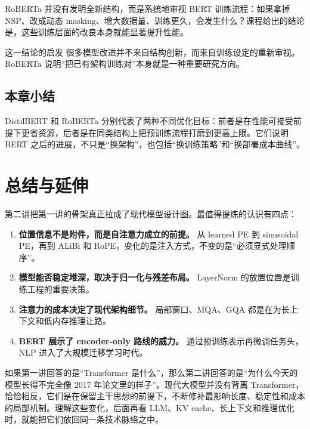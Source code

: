 \documentclass[a4paper]{article}
\begin{document}
RoBERTa 并没有发明全新结构，而是系统地审视 BERT 训练流程：如果拿掉 NSP、改成动态 masking、增大数据量、训练更久，会发生什么？课程给出的结论是，这些训练层面的改良本身就能显著提升性能。

\begin{warningbox}{这一结论的启发}
很多模型改进并不来自结构创新，而来自训练设定的重新审视。RoBERTa 说明“把已有架构训练对”本身就是一种重要研究方向。
\end{warningbox}

\subsection{本章小结}

DistilBERT 和 RoBERTa 分别代表了两种不同优化目标：前者是在性能可接受前提下更省资源，后者是在同类结构上把预训练流程打磨到更高上限。它们说明 BERT 之后的进展，不只是“换架构”，也包括“换训练策略”和“换部署成本曲线”。

\section{总结与延伸}

第二讲把第一讲的骨架真正拉成了现代模型设计图。最值得提炼的认识有四点：
\begin{enumerate}
\item \textbf{位置信息不是附件，而是自注意力成立的前提。} 从 learned PE 到 sinusoidal PE，再到 ALiBi 和 RoPE，变化的是注入方式，不变的是“必须显式处理顺序”。
\item \textbf{模型能否稳定堆深，取决于归一化与残差布局。} LayerNorm 的放置位置是训练工程的重要决策。
\item \textbf{注意力的成本决定了现代架构细节。} 局部窗口、MQA、GQA 都是在为长上下文和低内存推理让路。
\item \textbf{BERT 展示了 encoder-only 路线的威力。} 通过预训练表示再微调任务头，NLP 进入了大规模迁移学习时代。
\end{enumerate}

如果第一讲回答的是“Transformer 是什么”，那么第二讲回答的是“为什么今天的模型长得不完全像 2017 年论文里的样子”。现代大模型并没有背离 Transformer，恰恰相反，它们是在保留主干思想的前提下，不断修补最影响长度、稳定性和成本的局部机制。理解这些变化，后面再看 LLM、KV cache、长上下文和推理优化时，就能把它们放回同一条技术脉络之中。
\end{document}
